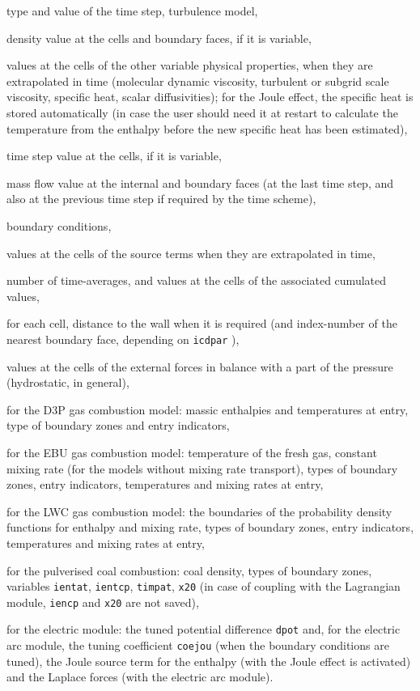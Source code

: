 {{{\begin{list}{-}{}
\item type and value of the time step, turbulence model,
\item density value at the cells and boundary faces, if it is variable,
\item values at the cells of the other variable physical properties,
when they are extrapolated in time (molecular dynamic viscosity, turbulent or
subgrid scale viscosity, specific heat, scalar diffusivities); for the Joule
effect, the specific heat is stored automatically (in case the user should need
it at restart to calculate the temperature from the enthalpy before the new
specific heat has been estimated),
\item time step value at the cells, if it is variable,
\item mass flow value at the internal and boundary faces (at the last
time step, and also at the previous time step if required by the time scheme),
\item boundary conditions,
\item values at the cells of the source terms when they are extrapolated in time,
\item number of time-averages, and values at the cells of the associated
cumulated values,
\item for each cell, distance to the wall when it is required (and
index-number of the nearest boundary face, depending on \texttt{icdpar}%
),
\item values at the cells of the external forces in balance with a part
of the pressure (hydrostatic, in general),
\item for the D3P gas combustion model: massic enthalpies and temperatures at entry,
type of boundary zones and entry indicators,
\item for the EBU gas combustion model: temperature of the fresh gas, constant
mixing rate (for the models without mixing rate transport), types of boundary
zones, entry indicators, temperatures and mixing rates at entry,
\item for the LWC gas combustion model: the boundaries of the probability
density functions for enthalpy and mixing rate, types of boundary
zones, entry indicators, temperatures and mixing rates at entry,
\item for the pulverised coal combustion: coal density,  types of boundary
zones, variables \texttt{ientat}, \texttt{ientcp}, \texttt{timpat}, \texttt{x20}
(in case of coupling with the Lagrangian module, \texttt{iencp} and \texttt{x20}
are not saved),
\item for the electric module: the tuned potential difference \texttt{dpot}%
and, for the electric arc module, the tuning coefficient \texttt{coejou}%
(when the boundary conditions are tuned), the Joule source term for the enthalpy
(with the Joule effect is activated) and the Laplace forces (with the electric
arc module).
\end{list}

}}}
